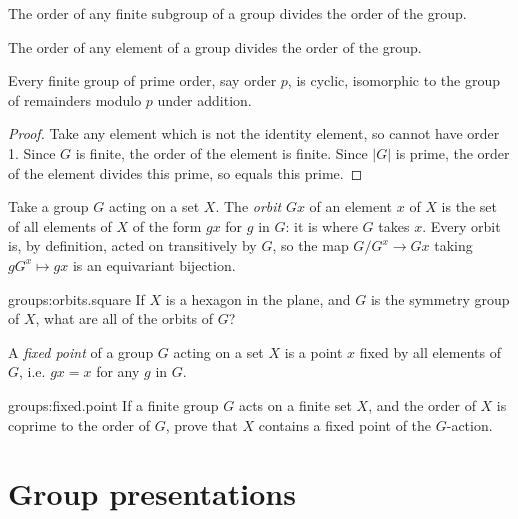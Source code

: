 \begin{corollary}
The order of any finite subgroup of a group divides the order of the group.
\end{corollary}

\begin{corollary}
The order of any element of a group divides the order of the group.
\end{corollary}

\begin{corollary}
Every finite group of prime order, say order \(p\), is cyclic, isomorphic to the group of remainders modulo \(p\) under addition.
\end{corollary}
\begin{proof}
Take any element which is not the identity element, so cannot have order 1.
Since \(G\) is finite, the order of the element is finite.
Since \(|G|\) is prime, the order of the element divides this prime, so equals this prime.
\end{proof}


Take a group \(G\) acting on a set \(X\).
The \emph{orbit} \(Gx\) of an element \(x\) of \(X\) is the set of all elements of \(X\) of the form \(gx\) for \(g\) in \(G\): it is where \(G\) takes \(x\).
Every orbit is, by definition, acted on transitively by \(G\), so the map \(G/G^x \to Gx\) taking \(gG^x \mapsto gx\) is an equivariant bijection.

\begin{problem}{groups:orbits.square}
If \(X\) is a hexagon in the plane, and \(G\) is the symmetry group of \(X\), what are all of the orbits of \(G\)?
\end{problem}

A \emph{fixed point} of a group \(G\) acting on a set \(X\) is a point \(x\) fixed by all elements of \(G\), i.e. \(gx=x\) for any \(g\) in \(G\).

\begin{problem}{groups:fixed.point}
If a finite group \(G\) acts on a finite set \(X\), and the order of \(X\) is coprime to the order of \(G\), prove that \(X\) contains a fixed point of the \(G\)-action.
\end{problem}



\section{Group presentations}


